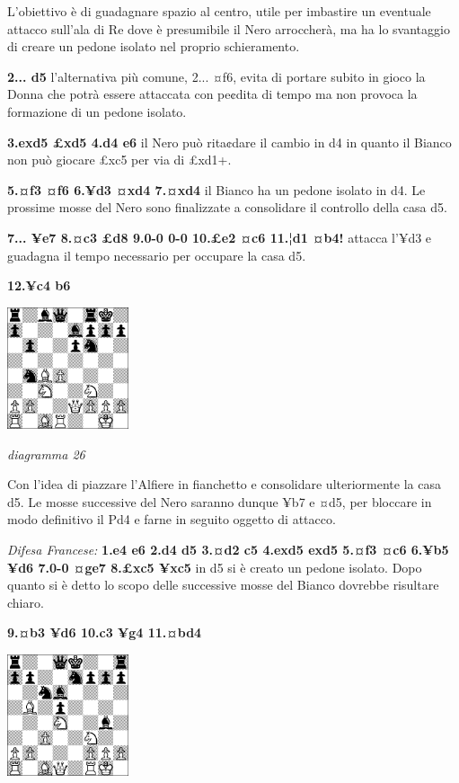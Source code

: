 \documentclass[
]{article}
\begin{document}
L'obiettivo è di guadagnare spazio al centro, utile per imbastire un
eventuale attacco sull'ala di Re dove è presumibile il Nero arroccherà,
ma ha lo svantaggio di creare un pedone isolato nel proprio
schieramento.

\textbf{2... d5} l'alternativa più comune, 2... ¤f6, evita di portare
subito in gioco la Donna che potrà essere attaccata con pe¢dita di tempo
ma non provoca la formazione di un pedone isolato.

\textbf{3.exd5 £xd5 4.d4 e6} il Nero può rita¢dare il cambio in d4 in
quanto il Bianco non può giocare £xc5 per via di £xd1+.

\textbf{5.¤f3 ¤f6 6.¥d3 ¤xd4 7.¤xd4} il Bianco ha un pedone isolato in
d4. Le prossime mosse del Nero sono finalizzate a consolidare il
controllo della casa d5.

\textbf{7... ¥e7 8.¤c3 £d8 9.0-0 0-0 10.£e2 ¤c6 11.¦d1 ¤b4!} attacca
l'¥d3 e guadagna il tempo necessario per occupare la casa d5.

\textbf{12.¥c4 b6}

\includegraphics[width=1.40972in,height=1.40972in]{vertopal_109f12be458a423d8f3cc838880eaea2/media/image26.png}

\emph{diagramma 26}

Con l'idea di piazzare l'Alfiere in fianchetto e consolidare
ulteriormente la casa d5. Le mosse successive del Nero saranno dunque
¥b7 e ¤d5, per bloccare in modo definitivo il Pd4 e farne in seguito
oggetto di attacco.

\emph{Difesa Francese:} \textbf{1.e4 e6 2.d4 d5 3.¤d2 c5 4.exd5 exd5
5.¤f3 ¤c6 6.¥b5 ¥d6 7.0-0 ¤ge7 8.£xc5 ¥xc5} in d5 si è creato un pedone
isolato. Dopo quanto si è detto lo scopo delle successive mosse del
Bianco dovrebbe risultare chiaro.

\textbf{9.¤b3 ¥d6 10.c3 ¥g4 11.¤bd4}

\includegraphics[width=1.40972in,height=1.40972in]{vertopal_109f12be458a423d8f3cc838880eaea2/media/image27.png}
\end{document}
